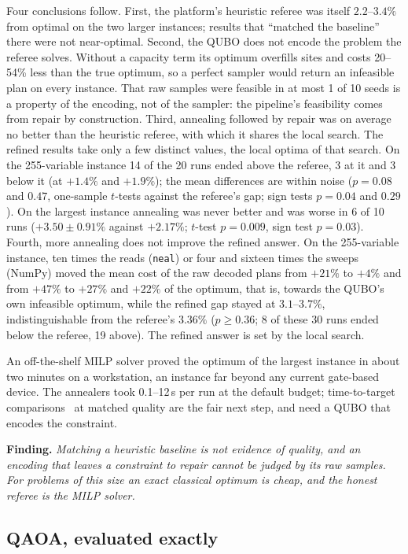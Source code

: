 \documentclass[11pt,a4paper]{article}
\newcommand{\finding}[1]{\par\smallskip\noindent\textbf{Finding.} \emph{#1}\par\smallskip}
\begin{document}
Four conclusions follow. First, the platform's heuristic referee was itself
$2.2$--$3.4\%$ from optimal on the two larger instances; results that
``matched the baseline'' there were not near-optimal. Second, the QUBO does
not encode the problem the referee solves. Without a capacity term its
optimum overfills sites and costs 20--54\% less than the true optimum, so a
perfect sampler would return an infeasible plan on every instance. That raw
samples were feasible in at most 1 of 10 seeds is a property of the
encoding, not of the sampler: the pipeline's feasibility comes from repair by
construction. Third, annealing followed by repair was on average no better
than the heuristic referee, with which it shares the local search. The
refined results take only a few distinct values, the local optima of that
search. On the 255-variable instance 14 of the 20 runs ended above the
referee, 3 at it and 3 below it (at $+1.4\%$ and $+1.9\%$); the mean
differences are within noise ($p = 0.08$ and $0.47$, one-sample $t$-tests
against the referee's gap; sign tests $p = 0.04$ and $0.29$). On the largest
instance annealing was never better and was worse in 6 of 10 runs
($+3.50 \pm 0.91\%$ against $+2.17\%$; $t$-test $p = 0.009$, sign test
$p = 0.03$). Fourth, more annealing does not improve the refined answer. On
the 255-variable instance, ten times the reads (\texttt{neal}) or four and
sixteen times the sweeps (NumPy) moved the mean cost of the raw decoded
plans from $+21\%$ to $+4\%$ and from $+47\%$ to $+27\%$ and $+22\%$ of the
optimum, that is, towards the QUBO's own infeasible optimum, while the
refined gap stayed at $3.1$--$3.7\%$, indistinguishable from the referee's
$3.36\%$ ($p \ge 0.36$; 8 of these 30 runs ended below the referee, 19
above). The refined answer is set by the local search.

An off-the-shelf MILP solver proved the optimum of the largest instance in
about two minutes on a workstation, an instance far beyond any current
gate-based device. The annealers took 0.1--12\,s per run at the default
budget;
time-to-target comparisons~\cite{ronnow2014} at matched quality are the fair
next step, and need a QUBO that encodes the constraint.

\finding{Matching a heuristic baseline is not evidence of quality, and an
encoding that leaves a constraint to repair cannot be judged by its raw
samples. For problems of this size an exact classical optimum is cheap, and
the honest referee is the MILP solver.}

\subsection{QAOA, evaluated exactly}
\label{sec:res-qaoa}
\end{document}
